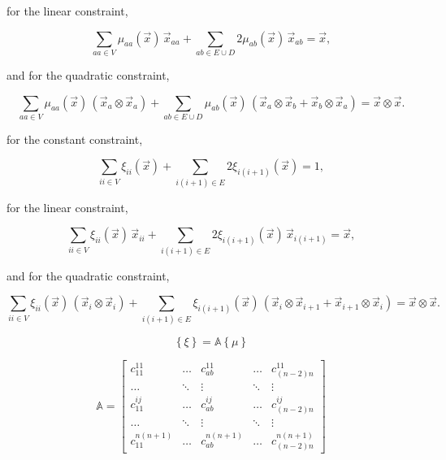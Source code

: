 \noindent for the linear constraint,

\begin{equation}
\label{eq::BF_quad_interp_req_linear_alt}
\sum_{aa \in V}  \mu_{aa} (\vec{x}) \, \vec{x}_{aa} +  \sum_{ab \in E \cup D} 2  \mu_{ab} (\vec{x}) \, \vec{x}_{ab} = \vec{x} ,
\end{equation}

\noindent and for the quadratic constraint,

\begin{equation}
\label{eq::BF_quad_interp_req_quadratic_alt}
\sum_{aa \in V}  \mu_{aa} (\vec{x}) \, \left( \vec{x}_a \otimes \vec{x}_a \right) +  \sum_{ab \in E \cup D}   \mu_{ab} (\vec{x}) \, \left( \vec{x}_a \otimes \vec{x}_b + \vec{x}_b \otimes \vec{x}_a \right)   =  \vec{x} \otimes \vec{x} .
\end{equation}


for the constant constraint,

\begin{equation}
\label{eq::BF_ser_interp_req_constant_alt}
\sum_{ii \in V}  \xi_{ii} (\vec{x}) + \sum_{i(i+1) \in E} 2 \xi_{i(i+1)} (\vec{x})  = 1 ,
\end{equation}

\noindent for the linear constraint,

\begin{equation}
\label{eq::BF_ser_interp_req_linear_alt}
\sum_{ii \in V}  \xi_{ii} (\vec{x}) \, \vec{x}_{ii} +  \sum_{i(i+1) \in E} 2  \xi_{i(i+1)} (\vec{x}) \, \vec{x}_{i(i+1)} = \vec{x} ,
\end{equation}

\noindent and for the quadratic constraint,

\begin{equation}
\label{eq::BF_ser_interp_req_quadratic_alt}
\sum_{ii \in V}  \xi_{ii} (\vec{x}) \, \left( \vec{x}_i \otimes \vec{x}_i \right) +  \sum_{i(i+1) \in E}   \xi_{i(i+1)} (\vec{x}) \, \left( \vec{x}_i \otimes \vec{x}_{i+1} + \vec{x}_{i+1} \otimes \vec{x}_i \right)   =  \vec{x} \otimes \vec{x} .
\end{equation}



\begin{equation}
\label{eq::BF_quad_to_ser_mapping}
\left\{ \xi \right\} = \mathbb{A} \left\{ \mu \right\}
\end{equation}

\begin{equation}
\label{eq::BF_quad_to_ser_matrix_constraints}
\mathbb{A} = 
\left[
\begin{array}{ccccc}
c_{11}^{11} & \ldots & c_{ab}^{11} & \ldots & c_{(n-2)n}^{11} \\
\ldots&\ddots&\vdots&\ddots&\vdots \\
c_{11}^{ij} & \ldots & c_{ab}^{ij} & \ldots & c_{(n-2)n}^{ij} \\
\ldots&\ddots&\vdots&\ddots&\vdots \\
c_{11}^{n(n+1)} & \ldots & c_{ab}^{n(n+1)} & \ldots & c_{(n-2)n}^{n(n+1)} 
\end{array}
\right]
\end{equation}


